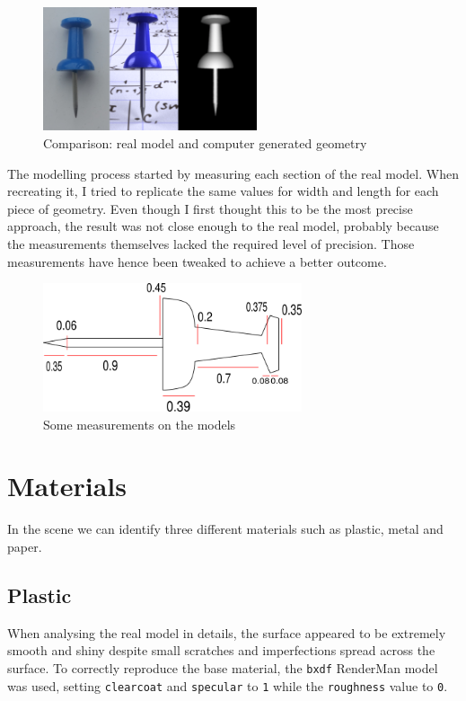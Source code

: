 \documentclass[tog]{acmsiggraph}
\begin{document}
\begin{figure}[h]
  \centering
  \includegraphics[width=6.3cm]{images/modelling}
  \caption{Comparison: real model and computer generated geometry}
  \label{fig:modelling}
\end{figure}

\vspace{1.0cm}
The modelling process started by measuring each section of the real model. When recreating it, I tried to replicate the same values for width and length for each piece of geometry. Even though I first thought this to be the most precise approach, the result was not close enough to the real model, probably because the measurements themselves lacked the required level of precision.
Those measurements have hence been tweaked to achieve a better outcome.

\begin{figure}[h!]
  \centering
  \includegraphics[width=3.0in]{images/measurements}
  \caption{Some measurements on the models}
  \label{fig:measurements}
\end{figure}

\newpage
\section{Materials}

In the scene we can identify three different materials such as plastic, metal and paper.

\subsection{Plastic}
When analysing the real model in details, the surface appeared to be extremely smooth and shiny despite small scratches and imperfections spread across the surface. To correctly reproduce the base material, the \texttt{bxdf} RenderMan model was used, setting \texttt{clearcoat} and \texttt{specular} to \texttt{1} while the \texttt{roughness} value to \texttt{0}.
\end{document}
